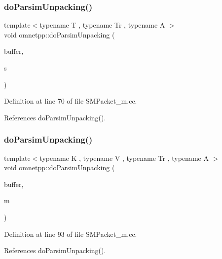 \subsubsection{\texorpdfstring{do\+Parsim\+Unpacking()}{doParsimUnpacking()}\hspace{0.1cm}{\footnotesize\ttfamily [3/5]}}
{\footnotesize\ttfamily template$<$typename T , typename Tr , typename A $>$ \\
void omnetpp\+::do\+Parsim\+Unpacking (\begin{DoxyParamCaption}\item[{omnetpp\+::c\+Comm\+Buffer $\ast$}]{buffer,  }\item[{std\+::set$<$ T, Tr, A $>$ \&}]{s }\end{DoxyParamCaption})}



Definition at line 70 of file S\+M\+Packet\+\_\+m.\+cc.



References do\+Parsim\+Unpacking().

\mbox{\label{namespaceomnetpp_a6fd2557203871e46db43fa9c63968117}} 
\subsubsection{\texorpdfstring{do\+Parsim\+Unpacking()}{doParsimUnpacking()}\hspace{0.1cm}{\footnotesize\ttfamily [4/5]}}
{\footnotesize\ttfamily template$<$typename K , typename V , typename Tr , typename A $>$ \\
void omnetpp\+::do\+Parsim\+Unpacking (\begin{DoxyParamCaption}\item[{omnetpp\+::c\+Comm\+Buffer $\ast$}]{buffer,  }\item[{std\+::map$<$ K, V, Tr, A $>$ \&}]{m }\end{DoxyParamCaption})}



Definition at line 93 of file S\+M\+Packet\+\_\+m.\+cc.



References do\+Parsim\+Unpacking().

\mbox{\label{namespaceomnetpp_a7336b297a32484942d52667dae7c7248}} 
